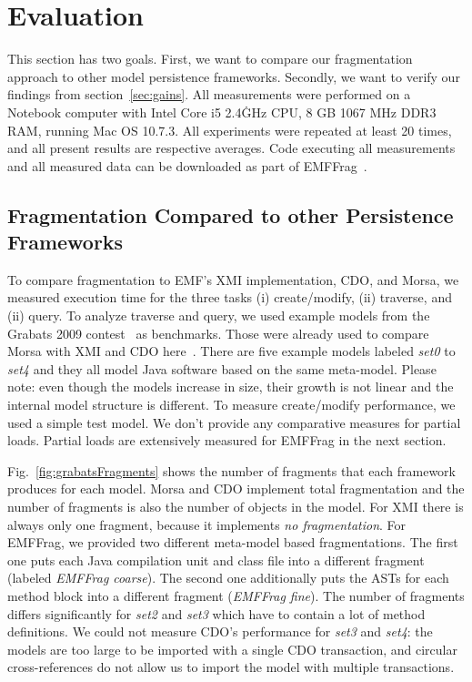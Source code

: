 \section{Evaluation}
\label{sec:evaluation}

This section has two goals. First, we want to compare our fragmentation approach to other model persistence frameworks. Secondly, we want to verify our findings from section~\ref{sec:gains}. 
All measurements were performed on a Notebook computer with Intel Core i5 2.4\.GHz CPU, 8 GB 1067 MHz DDR3 RAM, running Mac OS 10.7.3. All experiments were repeated at least 20 times, and all present results are respective averages. Code executing all measurements and all measured data can be downloaded as part of EMFFrag~\cite{EMFFragProject}.

\subsection{Fragmentation Compared to other Persistence Frameworks}

To compare fragmentation to EMF's XMI implementation, CDO, and Morsa, we measured execution time for the three tasks (i) create/modify, (ii) traverse, and (ii) query. To analyze traverse and query, we used example models from the Grabats 2009 contest~\cite{grabats} as benchmarks. Those were already used to compare Morsa with XMI and CDO here~\cite{morsa2011}. There are five example models labeled \emph{set0} to \emph{set4} and they all model Java software based on the same meta-model. Please note: even though the models increase in size, their growth is not linear and the internal model structure is different. To measure create/modify performance, we used a simple test model. We don't provide any comparative measures for partial loads. Partial loads are extensively measured for EMFFrag in the next section.

Fig.~\ref{fig:grabatsFragments} shows the number of fragments that each framework produces for each model. Morsa and CDO implement total fragmentation and the number of fragments is also the number of objects in the model. For XMI there is always only one fragment, because it implements \emph{no fragmentation}. For EMFFrag, we provided two different meta-model based fragmentations. The first one puts each Java compilation unit and class file into a different fragment (labeled \emph{EMFFrag coarse}). The second one additionally puts the ASTs for each method block into a different fragment (\emph{EMFFrag fine}). The number of fragments differs significantly for \emph{set2} and \emph{set3} which have to contain a lot of method definitions. We could not measure CDO's performance for \emph{set3} and \emph{set4}: the models are too large to be imported with a single CDO transaction, and circular cross-references do not allow us to import the model with multiple transactions.

